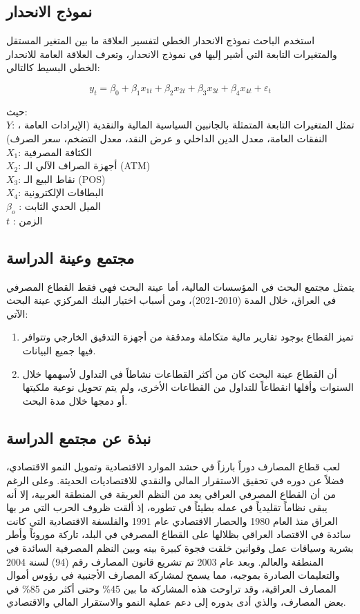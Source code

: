 \documentclass[10pt,a4paper]{report}
\begin{document}
\begin{doublespacing}
\subsection{نموذج الانحدار}
استخدم الباحث نموذج الانحدار الخطي لتفسير العلاقة ما بين المتغير المستقل والمتغيرات التابعة التي أشير إليها في نموذج الانحدار، وتعرف العلاقة العامة للانحدار الخطي البسيط كالتالي:

\[
y_t = \beta_0 + \beta_1 x_{1t} + \beta_2 x_{2t} + \beta_3 x_{3t} + \beta_4 x_{4t} + \varepsilon_t 
\]

حيث:\\
$Y$: تمثل المتغيرات التابعة المتمثلة بالجانبين السياسية المالية والنقدية (الإيرادات العامة ، النفقات العامة، معدل الدين الداخلي و عرض  النقد، معدل التضخم، سعر الصرف)\\
$X_1$: الكثافة المصرفية \\
$X_2$:  أجهزة الصراف الآلي الـ (ATM)\\
$X_3$: نقاط البيع الـ (POS)\\
$X_4$: البطاقات الإلكترونية\\
$\beta_o$ : الميل الحدي الثابت\\
$t$ : الزمن 
\subsection{مجتمع وعينة الدراسة}
يتمثل مجتمع البحث في المؤسسات المالية، أما عينة البحث فهي فقط القطاع المصرفي في العراق، خلال المدة (2010-2021)، ومن أسباب اختيار البنك المركزي عينة البحث الآتي:
\begin{enumerate}
	\item تميز القطاع بوجود تقارير مالية متكاملة ومدققة من أجهزة التدقيق الخارجي وتتوافر فيها جميع البيانات.
	\item أن القطاع عينة البحث كان من أكثر القطاعات نشاطاً في التداول لأسهمها خلال السنوات وأقلها انقطاعاً للتداول من القطاعات الأخرى، ولم يتم تحويل نوعية ملكيتها أو دمجها خلال مدة البحث.
\end{enumerate}
\subsection{نبذة عن مجتمع الدراسة}
لعب قطاع المصارف دوراً بارزاً في حشد الموارد الاقتصادية وتمويل النمو الاقتصادي، فضلاً عن دوره في تحقيق الاستقرار المالي والنقدي للاقتصاديات الحديثة. وعلى الرغم من أن القطاع المصرفي العراقي يعد من النظم العريقة في المنطقة العربية، إلا أنه يبقى نظاماً تقليدياً في عمله بطيئاً في تطوره، إذ ألقت ظروف الحرب التي مر بها العراق منذ العام 1980 والحصار الاقتصادي عام 1991 والفلسفة الاقتصادية التي كانت سائدة في الاقتصاد العراقي بظلالها على القطاع المصرفي في البلد، تاركة موروثاً وأطر بشرية وسياقات عمل وقوانين خلقت فجوة كبيرة بينه وبين النظم المصرفية السائدة في المنطقة والعالم. وبعد عام 2003 تم تشريع قانون المصارف رقم (94) لسنة 2004 والتعليمات الصادرة بموجبه، مما يسمح لمشاركة المصارف الأجنبية في رؤوس أموال المصارف العراقية، وقد تراوحت هذه المشاركة ما بين 45\% وحتى أكثر من 85\% في بعض المصارف، والذي أدى بدوره إلى دعم عملية النمو والاستقرار المالي والاقتصادي.

\end{doublespacing}
\end{document}
